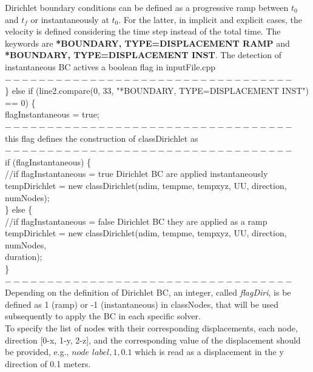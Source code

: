 \documentclass[oneside,11pt,times]{book}
\begin{document}
Dirichlet boundary conditions can be defined as a progressive ramp between $t_0$ and $t_f$ or instantaneously at $t_0$. For the latter, in implicit and explicit cases, the velocity is defined considering the time step instead of the total time. The keywords are \textbf{*BOUNDARY, TYPE=DISPLACEMENT RAMP} and \textbf{*BOUNDARY, TYPE=DISPLACEMENT INST}. The detection of instantaneous BC actives a boolean flag in inputFile.cpp \\
$\bm{----------------------------------}$\\
\} else if (line2.compare(0, 33, "*BOUNDARY, TYPE=DISPLACEMENT INST") == 0) \{ \\
flagInstantaneous = true; \\
$\bm{----------------------------------}$\\
this flag defines the construction of classDirichlet as
\\
$\bm{----------------------------------}$\\
if (flagInstantaneous) \{\\
                    \hspace*{0.5cm}//if flagInstantaneous = true Dirichlet BC are applied instantaneously\\
                    \hspace*{0.5cm}tempDirichlet = new classDirichlet(ndim, tempme, tempxyz, UU, direction, numNodes);\\
                \} else \{\\
                   \hspace*{0.5cm} //if flagInstantaneous = false Dirichlet BC they are applied as a ramp\\
                   \hspace*{0.5cm} tempDirichlet = new classDirichlet(ndim, tempme, tempxyz, UU, direction, numNodes,\\ \hspace*{0.5cm} duration);\\
                \}
 \\
$\bm{----------------------------------}$\\
Depending on the definition of Dirichlet BC, an integer, called \textit{flagDiri}, is be defined as 1 (ramp) or -1 (instantaneous) in classNodes, that will be used subsequently to apply the BC in each specific solver.\\
To specify the list of nodes with their corresponding displacements, each  node, direction [0-x, 1-y, 2-z], and the corresponding value of the displacement should be provided, e.g., $node$ $label, 1, 0.1$ which is read as a displacement in the y direction of 0.1 meters.
\end{document}
